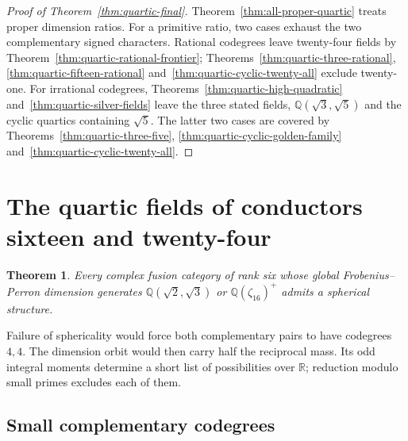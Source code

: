 \documentclass[11pt,reqno]{amsart}
\newtheorem{theorem}{Theorem}[section]
\theoremstyle{remark}\newtheorem{remark}[theorem]{Remark}
\numberwithin{equation}{section}
\begin{document}
\begin{proof}[Proof of Theorem~\ref{thm:quartic-final}]
Theorem~\ref{thm:all-proper-quartic} treats proper dimension ratios.
For a primitive ratio, two cases exhaust the two complementary signed
characters. Rational codegrees leave twenty-four fields by
Theorem~\ref{thm:quartic-rational-frontier}; Theorems~\ref{thm:quartic-three-rational},
\ref{thm:quartic-fifteen-rational} and~\ref{thm:quartic-cyclic-twenty-all}
exclude twenty-one. For irrational codegrees, Theorems~\ref{thm:quartic-high-quadratic}
and~\ref{thm:quartic-silver-fields} leave the three stated fields,
$\mathbb Q(\sqrt3,\sqrt5)$ and the cyclic quartics containing $\sqrt5$.
The latter two cases are covered by Theorems~\ref{thm:quartic-three-five},
\ref{thm:quartic-cyclic-golden-family} and~\ref{thm:quartic-cyclic-twenty-all}.
\end{proof}

\section{The quartic fields of conductors sixteen and twenty-four}\label{sec:guide-1624}
\begin{theorem}\label{thm:quartic-four-complete}
Every complex fusion category of rank six whose global Frobenius--Perron dimension generates $\mathbb Q(\sqrt2,\sqrt3)$ or $\mathbb Q(\zeta_{16})^+$ admits a spherical structure.
\end{theorem}
Failure of sphericality would force both complementary pairs to have
codegrees $4,4$. The dimension orbit would then carry half the
reciprocal mass. Its odd integral moments determine a short list of
possibilities over $\mathbb R$; reduction modulo small primes excludes
each of them.
\subsection{Small complementary codegrees}
\end{document}
